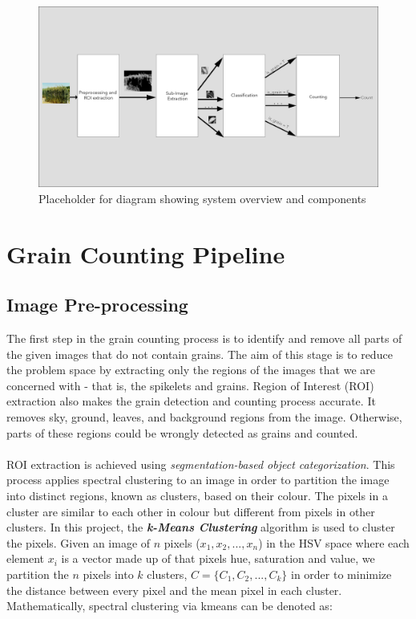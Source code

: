 \smallskip

\begin{figure}[ht!]
\centering
\includegraphics[scale=.35]{Images/design_pipeline2}
\caption{Placeholder for diagram showing system overview and components}
\label{fig1}
\end{figure}

\smallskip

\goodbreak
\section{Grain Counting Pipeline}
\subsection{Image Pre-processing}
The first step in the grain counting process is to identify and remove all parts of the given images that do not contain grains. The aim of this stage is to reduce the problem space by extracting only the regions of the images that we are concerned with - that is, the spikelets and grains. Region of Interest (ROI) extraction also makes the grain detection and counting process accurate. It removes sky, ground, leaves, and background regions from the image. Otherwise, parts of these regions could be wrongly detected as grains and counted.\\ \\
%
ROI extraction is achieved using \textit{segmentation-based object categorization}. This process applies spectral clustering to an image in order to partition the image into distinct regions, known as clusters, based on their colour. The pixels in a cluster are similar to each other in colour but different from pixels in other clusters. In this project, the \textit{\textbf{k-Means Clustering}}\cite{REF25} algorithm is used to cluster the pixels. Given an image of $n$ pixels ($x_1, x_2, ..., x_n$) in the HSV space \cite{REF26} where each element $x_i$ is a vector made up of that pixels hue, saturation and value, we partition the $n$ pixels into $k$ clusters, $C = \{C_1, C_2, ..., C_k\}$ in order to minimize the distance between every pixel and the mean pixel in each cluster. Mathematically, spectral clustering via kmeans can be denoted as:

